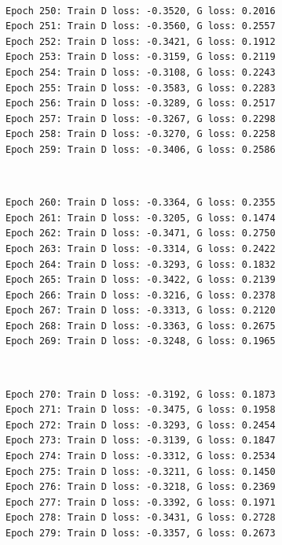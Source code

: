 \documentclass[11pt]{article}
\begin{document}
    \begin{center}
    \end{center}
    { \hspace*{\fill} \\}
    
    \begin{Verbatim}[commandchars=\\\{\}]
Epoch 250: Train D loss: -0.3520, G loss: 0.2016
Epoch 251: Train D loss: -0.3560, G loss: 0.2557
Epoch 252: Train D loss: -0.3421, G loss: 0.1912
Epoch 253: Train D loss: -0.3159, G loss: 0.2119
Epoch 254: Train D loss: -0.3108, G loss: 0.2243
Epoch 255: Train D loss: -0.3583, G loss: 0.2283
Epoch 256: Train D loss: -0.3289, G loss: 0.2517
Epoch 257: Train D loss: -0.3267, G loss: 0.2298
Epoch 258: Train D loss: -0.3270, G loss: 0.2258
Epoch 259: Train D loss: -0.3406, G loss: 0.2586

    \end{Verbatim}

    \begin{center}
    \end{center}
    { \hspace*{\fill} \\}
    
    \begin{Verbatim}[commandchars=\\\{\}]
Epoch 260: Train D loss: -0.3364, G loss: 0.2355
Epoch 261: Train D loss: -0.3205, G loss: 0.1474
Epoch 262: Train D loss: -0.3471, G loss: 0.2750
Epoch 263: Train D loss: -0.3314, G loss: 0.2422
Epoch 264: Train D loss: -0.3293, G loss: 0.1832
Epoch 265: Train D loss: -0.3422, G loss: 0.2139
Epoch 266: Train D loss: -0.3216, G loss: 0.2378
Epoch 267: Train D loss: -0.3313, G loss: 0.2120
Epoch 268: Train D loss: -0.3363, G loss: 0.2675
Epoch 269: Train D loss: -0.3248, G loss: 0.1965

    \end{Verbatim}

    \begin{center}
    \end{center}
    { \hspace*{\fill} \\}
    
    \begin{Verbatim}[commandchars=\\\{\}]
Epoch 270: Train D loss: -0.3192, G loss: 0.1873
Epoch 271: Train D loss: -0.3475, G loss: 0.1958
Epoch 272: Train D loss: -0.3293, G loss: 0.2454
Epoch 273: Train D loss: -0.3139, G loss: 0.1847
Epoch 274: Train D loss: -0.3312, G loss: 0.2534
Epoch 275: Train D loss: -0.3211, G loss: 0.1450
Epoch 276: Train D loss: -0.3218, G loss: 0.2369
Epoch 277: Train D loss: -0.3392, G loss: 0.1971
Epoch 278: Train D loss: -0.3431, G loss: 0.2728
Epoch 279: Train D loss: -0.3357, G loss: 0.2673

    \end{Verbatim}
\end{document}
